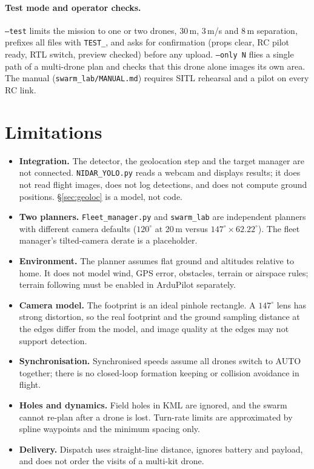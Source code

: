 \documentclass[11pt,a4paper]{article}
\newcommand{\code}[1]{\texttt{#1}}
\begin{document}
\paragraph{Test mode and operator checks.} \code{--test} limits the mission to one or two drones, 30\,m,
3\,m/s and 8\,m separation, prefixes all files with \code{TEST\_}, and asks for confirmation (props clear,
RC pilot ready, RTL switch, preview checked) before any upload. \code{--only N} flies a single path of a
multi-drone plan and checks that this drone alone images its own area. The manual
(\code{swarm\_lab/MANUAL.md}) requires SITL rehearsal and a pilot on every RC link.

\section{Limitations}
\label{sec:limits}

\begin{itemize}
  \item \textbf{Integration.} The detector, the geolocation step and the target manager are not connected.
        \code{NIDAR\_YOLO.py} reads a webcam and displays results; it does not read flight images, does not
        log detections, and does not compute ground positions. \S\ref{sec:geoloc} is a model, not code.
  \item \textbf{Two planners.} \code{Fleet\_manager.py} and \code{swarm\_lab} are independent planners with
        different camera defaults ($120^\circ$ at 20\,m versus $147^\circ\times62.22^\circ$). The fleet manager's
        tilted-camera derate is a placeholder.
  \item \textbf{Environment.} The planner assumes flat ground and altitudes relative to home. It does not
        model wind, GPS error, obstacles, terrain or airspace rules; terrain following must be enabled in
        ArduPilot separately.
  \item \textbf{Camera model.} The footprint is an ideal pinhole rectangle. A $147^\circ$ lens has strong
        distortion, so the real footprint and the ground sampling distance at the edges differ from the
        model, and image quality at the edges may not support detection.
  \item \textbf{Synchronisation.} Synchronised speeds assume all drones switch to AUTO together; there is no
        closed-loop formation keeping or collision avoidance in flight.
  \item \textbf{Holes and dynamics.} Field holes in KML are ignored, and the swarm cannot re-plan after a
        drone is lost. Turn-rate limits are approximated by spline waypoints and the minimum spacing only.
  \item \textbf{Delivery.} Dispatch uses straight-line distance, ignores battery and payload, and does not
        order the visits of a multi-kit drone.
\end{itemize}
\end{document}
